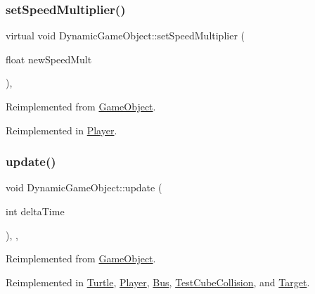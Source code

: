 \subsubsection{\texorpdfstring{set\+Speed\+Multiplier()}{setSpeedMultiplier()}}
{\footnotesize\ttfamily virtual void Dynamic\+Game\+Object\+::set\+Speed\+Multiplier (\begin{DoxyParamCaption}\item[{float}]{new\+Speed\+Mult }\end{DoxyParamCaption})\hspace{0.3cm}{\ttfamily [inline]}, {\ttfamily [virtual]}}



Reimplemented from \hyperlink{class_game_object_ab3d0617433250c19ccbb64bfca1bb905}{Game\+Object}.



Reimplemented in \hyperlink{class_player_a9098e6b411ea9102b02bb911eca6515b}{Player}.

\mbox{\label{class_dynamic_game_object_aaa505b57d131bbbce44d500ec2ca0e83}} 
\subsubsection{\texorpdfstring{update()}{update()}}
{\footnotesize\ttfamily void Dynamic\+Game\+Object\+::update (\begin{DoxyParamCaption}\item[{int}]{delta\+Time }\end{DoxyParamCaption})\hspace{0.3cm}{\ttfamily [inline]}, {\ttfamily [override]}, {\ttfamily [virtual]}}



Reimplemented from \hyperlink{class_game_object_a6dc5215a3d0efc7a9e2332006b31c868}{Game\+Object}.



Reimplemented in \hyperlink{class_turtle_a6d62e3f4e21f5ce3ffb4e7e2a8a9da1b}{Turtle}, \hyperlink{class_player_a51e705a6ad3628144e02832d1839b360}{Player}, \hyperlink{class_bus_ad07157ce2a50211ea599d040da7a4517}{Bus}, \hyperlink{class_test_cube_collision_ae528ac632377372d93964c938748fddf}{Test\+Cube\+Collision}, and \hyperlink{class_target_a5f3b2dc70e8065e53199ab3244059ba7}{Target}.



